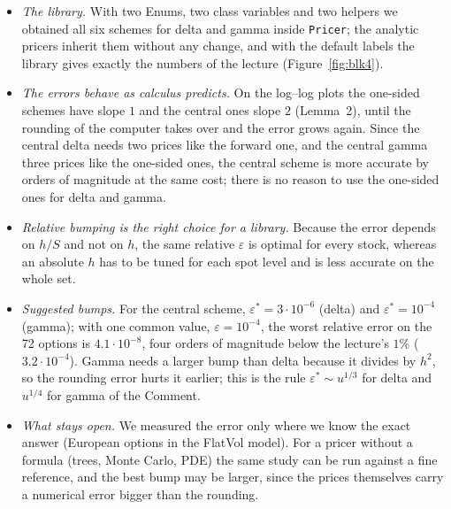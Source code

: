 \documentclass[11pt,a4paper]{article}
\newcommand{\subhead}[1]{\par\medskip\noindent{\large\bfseries #1}\par\smallskip\noindent\ignorespaces}
\renewcommand{\subhead}[1]{\par\medskip\needspace{8\baselineskip}\noindent{\large\bfseries #1}\par\smallskip\noindent\ignorespaces}
\begin{document}
\subhead{6. Conclusions.}
\begin{itemize}
\item \emph{The library.} With two Enums, two class variables and two helpers we obtained all six schemes for delta and gamma inside \texttt{Pricer}; the analytic pricers inherit them without any change, and with the default labels the library gives exactly the numbers of the lecture (Figure~\ref{fig:blk4}).
\item \emph{The errors behave as calculus predicts.} On the log--log plots the one-sided schemes have slope $1$ and the central ones slope $2$ (Lemma~2), until the rounding of the computer takes over and the error grows again. Since the central delta needs two prices like the forward one, and the central gamma three prices like the one-sided ones, the central scheme is more accurate by orders of magnitude at the same cost; there is no reason to use the one-sided ones for delta and gamma.
\item \emph{Relative bumping is the right choice for a library.} Because the error depends on $h/S$ and not on $h$, the same relative $\varepsilon$ is optimal for every stock, whereas an absolute $h$ has to be tuned for each spot level and is less accurate on the whole set.
\item \emph{Suggested bumps.} For the central scheme, $\varepsilon^*=3\cdot10^{-6}$ (delta) and $\varepsilon^*=10^{-4}$ (gamma); with one common value, $\varepsilon=10^{-4}$, the worst relative error on the 72 options is $4.1\cdot10^{-8}$, four orders of magnitude below the lecture's $1\%$ ($3.2\cdot10^{-4}$). Gamma needs a larger bump than delta because it divides by $h^2$, so the rounding error hurts it earlier; this is the rule $\varepsilon^*\sim u^{1/3}$ for delta and $u^{1/4}$ for gamma of the Comment.
\item \emph{What stays open.} We measured the error only where we know the exact answer (European options in the FlatVol model). For a pricer without a formula (trees, Monte Carlo, PDE) the same study can be run against a fine reference, and the best bump may be larger, since the prices themselves carry a numerical error bigger than the rounding.
\end{itemize}
\end{document}
